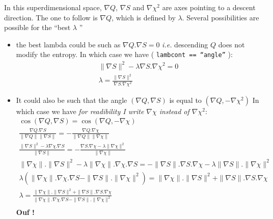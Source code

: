 \documentclass[]{article}
\begin{document}
In this superdimensional space, $\nabla Q$, $\nabla S$ and $\nabla \chi^2$ are axes pointing to a descent direction.
The one to follow is $\nabla Q$, which is defined by $\lambda$.
Several possibilities are possible for the ``best $\lambda$ ''
\begin{itemize}
    \item the best lambda could be such as $\nabla Q . \nabla S = 0$ \emph{i.e.} descending $Q$ does not modify the entropy.
        In which case we have ( \texttt{lambcont == ``angle''} ):
\begin{eqnarray}
    \|\nabla S\|^2 - \lambda \nabla S . \nabla \chi^2 = 0 \\
    \lambda = \frac{\|\nabla S\|^2}{\nabla S . \nabla \chi^2}
\end{eqnarray}
    \item It could also be such that the angle $(\nabla Q, \nabla S)$ is equal to $(\nabla Q, -\nabla \chi^2)$
    In which case we have \emph{for readibility I write $\nabla{\chi}$ instead of $\nabla{\chi^2}$}:
    \begin{eqnarray}
\cos(\nabla Q, \nabla S) =  \cos(\nabla Q, -\nabla \chi) \\
\frac{\nabla Q . \nabla S}{\|\nabla Q\| \|\nabla S\|} =  -\frac{\nabla Q . \nabla \chi}{\|\nabla Q\| \|\nabla \chi\|} \\
%
\frac{\|\nabla S\|^2 - \lambda \nabla{\chi} . \nabla S}{ \|\nabla S\|} = 
-\frac{\nabla S .\nabla \chi - \lambda \|\nabla \chi \|^2}{ \|\nabla \chi\|} \\
%
\|\nabla \chi\| . \|\nabla S\|^2 - \lambda \|\nabla \chi\|. \nabla \chi . \nabla S = 
- \|\nabla S\| . \nabla S .\nabla \chi - \lambda \|\nabla S\|. \|\nabla \chi \|^2 \\
%
  \lambda ( \|\nabla \chi\|. \nabla \chi . \nabla S - \|\nabla S\|. \|\nabla \chi \|^2  )= 
\|\nabla \chi\| . \|\nabla S\|^2 + \|\nabla S\| . \nabla S .\nabla \chi \\
%
  \lambda = 
\frac {\|\nabla \chi\| . \|\nabla S\|^2 + \|\nabla S\| . \nabla S .\nabla \chi }   {  \|\nabla \chi\|. \nabla \chi . \nabla S - \|\nabla S\|. \|\nabla \chi \|^2  }\\
    \end{eqnarray}
\textbf{Ouf !}
\end{itemize}





\end{document}
